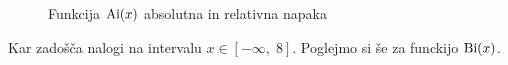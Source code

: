\begin{figure}[h]
    \begin{center}
        \caption{Funkcija $\mathrm{Ai}(x)$ absolutna in relativna napaka}
        \label{slika 4}
    \end{center}
\end{figure}
Kar zadošča nalogi na intervalu $x \in \left[-\infty,\; 8 \right]$. Poglejmo si še za funckijo $\mathrm{Bi}(x)$.
\newpage
